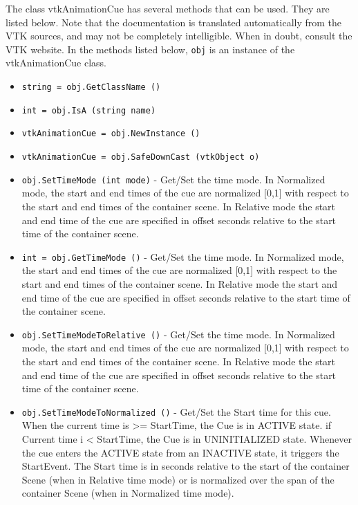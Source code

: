 The class vtkAnimationCue has several methods that can be used.
  They are listed below.
Note that the documentation is translated automatically from the VTK sources,
and may not be completely intelligible.  When in doubt, consult the VTK website.
In the methods listed below, \verb|obj| is an instance of the vtkAnimationCue class.
\begin{itemize}
\item  \verb|string = obj.GetClassName ()|

\item  \verb|int = obj.IsA (string name)|

\item  \verb|vtkAnimationCue = obj.NewInstance ()|

\item  \verb|vtkAnimationCue = obj.SafeDownCast (vtkObject o)|

\item  \verb|obj.SetTimeMode (int mode)| -  Get/Set the time mode. In Normalized mode, the start and end 
 times of the cue are normalized [0,1] with respect to the start and 
 end times of the container scene. In Relative mode the start and end
 time of the cue are specified in offset seconds relative to the 
 start time of the container scene.

\item  \verb|int = obj.GetTimeMode ()| -  Get/Set the time mode. In Normalized mode, the start and end 
 times of the cue are normalized [0,1] with respect to the start and 
 end times of the container scene. In Relative mode the start and end
 time of the cue are specified in offset seconds relative to the 
 start time of the container scene.

\item  \verb|obj.SetTimeModeToRelative ()| -  Get/Set the time mode. In Normalized mode, the start and end 
 times of the cue are normalized [0,1] with respect to the start and 
 end times of the container scene. In Relative mode the start and end
 time of the cue are specified in offset seconds relative to the 
 start time of the container scene.

\item  \verb|obj.SetTimeModeToNormalized ()| -  Get/Set the Start time for this cue.
 When the current time is >= StartTime, the Cue is in
 ACTIVE state. if Current time i < StartTime, the Cue is in
 UNINITIALIZED state. Whenever the cue enters the ACTIVE state from
 an INACTIVE state, it triggers the StartEvent.
 The Start time is in seconds relative to the start of the 
 container Scene (when in Relative time mode) or is normalized
 over the span of the container Scene (when in Normalized time mode).


\end{itemize}

